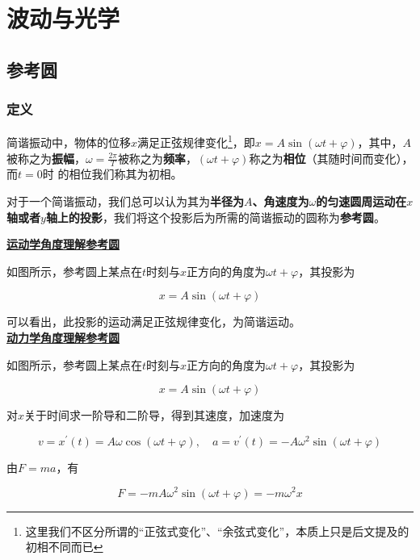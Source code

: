
\chapter{波动与光学}

\section{参考圆}

\subsection{定义}

简谐振动中，物体的位移$x$满足正弦规律变化\footnote{这里我们不区分所谓的“正弦式变化”、“余弦式变化”，本质上只是后文提及的初相不同而已}，即$x = A \sin (\omega t + \varphi)$，其中，$A$被称之为\textbf{振幅}，$\omega = \frac{2 \pi}{T}$被称之为\textbf{频率}，$(\omega t + \varphi)$称之为\textbf{相位}（其随时间而变化），而$t=0$时 的相位我们称其为$初相$。

对于一个简谐振动，我们总可以认为其为\textbf{半径为$A$、角速度为$\omega$的匀速圆周运动在$x$轴或者$y$轴上的投影}，我们将这个投影后为所需的简谐振动的圆称为\textbf{参考圆}。



\noindent \uline{\textbf{运动学角度理解参考圆}}

如图所示，参考圆上某点在$t$时刻与$x$正方向的角度为$\omega t + \varphi$，其投影为

$$x = A \sin (\omega t + \varphi)$$

可以看出，此投影的运动满足正弦规律变化，为简谐运动。
~\\

\noindent \uline{\textbf{动力学角度理解参考圆}}

如图所示，参考圆上某点在$t$时刻与$x$正方向的角度为$\omega t + \varphi$，其投影为

$$x = A \sin (\omega t + \varphi)$$

对$x$关于时间求一阶导和二阶导，得到其速度，加速度为

$$v = x^{\prime}(t) = A \omega \cos (\omega t + \varphi), \quad a = v^{\prime}(t) = - A \omega^2 \sin (\omega t + \varphi)$$

由$F = ma$，有

$$F = - m A \omega^2 \sin (\omega t + \varphi) = - m \omega^2 x$$

